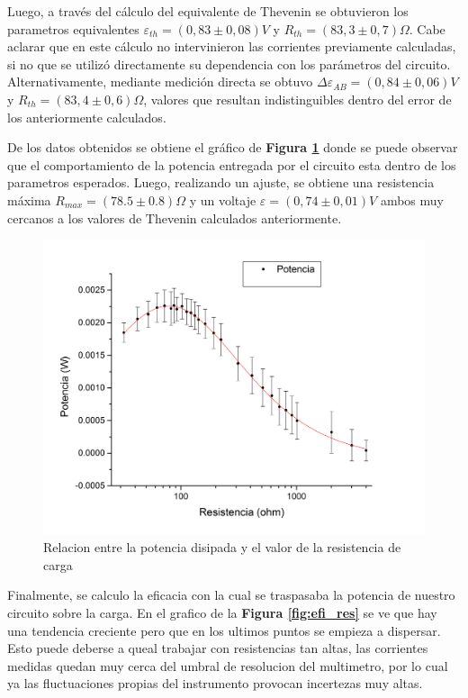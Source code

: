 \documentclass[11pt,a4paper]{article}
\begin{document}
Luego, a través del cálculo del equivalente de Thevenin se obtuvieron los parametros equivalentes $\varepsilon_{th} = (0,83\pm0,08)V$ y $R_{th} = (83,3 \pm 0,7) \Omega$. Cabe aclarar que en este cálculo no intervinieron las corrientes previamente calculadas, si no que se utilizó directamente su dependencia con los parámetros del circuito. Alternativamente, mediante medición directa se obtuvo $\Delta\varepsilon_{AB} = (0,84 \pm 0,06)V$ y $R_{th} = (83,4 \pm 0,6)\Omega$, valores que resultan indistinguibles dentro del error de los anteriormente calculados. 

De los datos obtenidos se obtiene el gráfico de \textbf{Figura \ref{fig:pot_res}} donde se puede observar que el comportamiento de la potencia entregada por el circuito esta dentro de los parametros esperados. Luego, realizando un ajuste, se obtiene una resistencia máxima $R_{max} = (78.5 \pm 0.8)\Omega$ y un voltaje $\varepsilon = (0,74\pm 0,01)V$ ambos muy cercanos a los valores de Thevenin calculados anteriormente.

\begin{figure}[h]
  \centering
  \includegraphics[scale=0.45]{Potencia_vs_Resistencia_2}
  \caption{Relacion entre la potencia disipada y el valor de la resistencia de carga}
  \label{fig:pot_res}
\end{figure}

Finalmente, se calculo la eficacia con la cual se traspasaba la potencia de nuestro circuito sobre la carga. En el grafico de la \textbf{Figura \ref{fig:efi_res}} se ve que hay una tendencia creciente pero que en los ultimos puntos se empieza a dispersar. Esto puede deberse a queal trabajar con resistencias tan altas, las corrientes medidas quedan muy cerca del umbral de resolucion del multimetro, por lo cual ya las fluctuaciones propias del instrumento provocan incertezas muy altas. 
\end{document}
